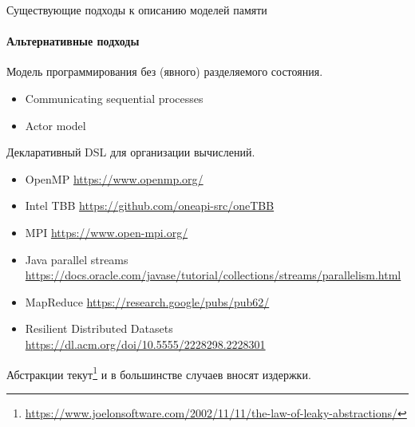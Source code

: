 \begin{frame}{Существующие подходы к описанию моделей памяти}
\framesubtitle{Альтернативные подходы}

Модель программирования без (явного) разделяемого состояния.
\pause
\begin{itemize}
	\item Communicating sequential processes
	\item Actor model
\end{itemize}

\pause
Декларативный DSL для организации вычислений.
\pause
\begin{itemize}
	\item OpenMP {\tiny\url{https://www.openmp.org/}}
	\item Intel TBB {\tiny\url{https://github.com/oneapi-src/oneTBB}}
	\item MPI {\tiny\url{https://www.open-mpi.org/}}
	\item Java parallel streams {\tiny\url{https://docs.oracle.com/javase/tutorial/collections/streams/parallelism.html}}
	\item MapReduce {\tiny\url{https://research.google/pubs/pub62/}}
	\item Resilient Distributed Datasets {\tiny\url{https://dl.acm.org/doi/10.5555/2228298.2228301}}
\end{itemize}

\pause
Абстракции текут\footnote<5->{\tiny\url{https://www.joelonsoftware.com/2002/11/11/the-law-of-leaky-abstractions/}} и в большинстве случаев вносят издержки.

\end{frame}


